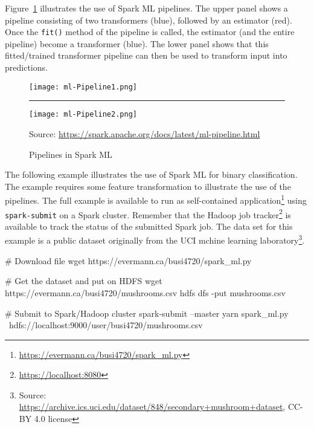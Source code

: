 Figure~\ref{fig:sparkpipelines} illustrates the use of Spark ML pipelines. The upper panel shows a pipeline consisting of two transformers (blue), followed by an estimator (red). Once the \texttt{fit()} method of the pipeline is called, the estimator (and the entire pipeline) become a transformer (blue). The lower panel shows that this fitted/trained transformer pipeline can then be used to transform input into predictions. 

\begin{figure}
\centering

\texttt{[image: ml-Pipeline1.png]} 

\vspace{.5\baselineskip}
\rule{.75\textwidth}{.5pt}
\vspace{.5\baselineskip}

\texttt{[image: ml-Pipeline2.png]} 

\scriptsize Source: \url{https://spark.apache.org/docs/latest/ml-pipeline.html} \normalsize
\caption{Pipelines in Spark ML}
\label{fig:sparkpipelines}
\end{figure}

The following example illustrates the use of Spark ML for binary classification. The example requires some feature transformation to illustrate the use of the pipelines. The full example is available to run as self-contained application\footnote{\url{https://evermann.ca/busi4720/spark_ml.py}} using \texttt{spark-submit} on a Spark cluster. Remember that the Hadoop job tracker\footnote{\url{https://localhost:8080}} is available to track the status of the submitted Spark job. The data set for this example is a public dataset originally from the UCI mchine learning laboratory\footnote{Source: \url{https://archive.ics.uci.edu/dataset/848/secondary+mushroom+dataset}, CC-BY 4.0 license}.

\begin{samepage}
\begin{bashcode}
# Download file
wget https://evermann.ca/busi4720/spark_ml.py

# Get the dataset and put on HDFS
wget https://evermann.ca/busi4720/mushrooms.csv
hdfs dfs -put mushrooms.csv

# Submit to Spark/Hadoop cluster
spark-submit --master yarn spark_ml.py \
    hdfs://localhost:9000/user/busi4720/mushrooms.csv
\end{bashcode}
\end{samepage}

